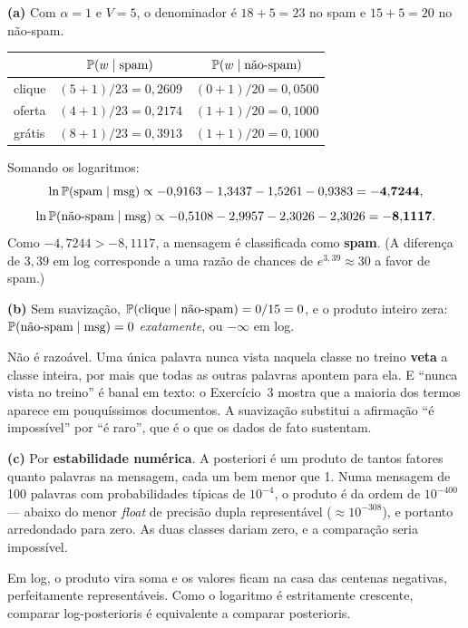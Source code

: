 \documentclass[11pt,a4paper]{article}
\begin{document}
\begin{solucao}
\textbf{(a)} Com $\alpha=1$ e $V=5$, o denominador é $18+5=23$ no spam e
$15+5=20$ no não-spam.
\begin{center}\small
\renewcommand{\arraystretch}{1.3}
\begin{tabular}{@{}lcc@{}}
\toprule
        & $\mathbb{P}(w\mid \text{spam})$ & $\mathbb{P}(w\mid \text{não-spam})$ \\
\midrule
clique  & $(5+1)/23 = 0{,}2609$ & $(0+1)/20 = 0{,}0500$ \\
oferta  & $(4+1)/23 = 0{,}2174$ & $(1+1)/20 = 0{,}1000$ \\
grátis  & $(8+1)/23 = 0{,}3913$ & $(1+1)/20 = 0{,}1000$ \\
\bottomrule
\end{tabular}
\end{center}
Somando os logaritmos:
\[
  \ln\mathbb{P}(\text{spam}\mid \text{msg}) \propto
  -0{,}9163 - 1{,}3437 - 1{,}5261 - 0{,}9383 = \mathbf{-4{,}7244},
\]
\[
  \ln\mathbb{P}(\text{não-spam}\mid \text{msg}) \propto
  -0{,}5108 - 2{,}9957 - 2{,}3026 - 2{,}3026 = \mathbf{-8{,}1117}.
\]
Como $-4{,}7244 > -8{,}1117$, a mensagem é classificada como \textbf{spam}. (A
diferença de $3{,}39$ em log corresponde a uma razão de chances de
$e^{3{,}39}\approx 30$ a favor de spam.)

\smallskip
\textbf{(b)} Sem suavização, $\mathbb{P}(\text{clique}\mid\text{não-spam}) =
0/15 = 0$, e o produto inteiro zera:
$\mathbb{P}(\text{não-spam}\mid\text{msg}) = 0$ \emph{exatamente}, ou $-\infty$ em
log.

Não é razoável. Uma única palavra nunca vista naquela classe no treino
\textbf{veta} a classe inteira, por mais que todas as outras palavras apontem
para ela. E ``nunca vista no treino'' é banal em texto: o Exercício~3 mostra que
a maioria dos termos aparece em pouquíssimos documentos. A suavização substitui a
afirmação ``é impossível'' por ``é raro'', que é o que os dados de fato
sustentam.

\smallskip
\textbf{(c)} Por \textbf{estabilidade numérica}. A posteriori é um produto de
tantos fatores quanto palavras na mensagem, cada um bem menor que 1. Numa
mensagem de 100 palavras com probabilidades típicas de $10^{-4}$, o produto é da
ordem de $10^{-400}$ --- abaixo do menor \emph{float} de precisão dupla
representável ($\approx 10^{-308}$), e portanto arredondado para zero. As duas
classes dariam zero, e a comparação seria impossível.

Em log, o produto vira soma e os valores ficam na casa das centenas negativas,
perfeitamente representáveis. Como o logaritmo é estritamente crescente,
comparar log-posterioris é equivalente a comparar posterioris.


\end{solucao}
\end{document}
